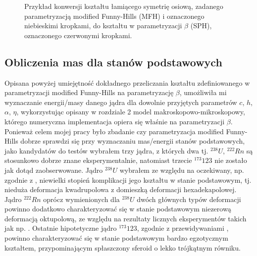 \documentclass[a4paper,polish]{article}
\numberwithin{equation}{section}
\begin{document}
\begin{figure}[ht!]
    \vspace{0.5cm}    
	\caption{Przykład konwersji kształtu łamiącego symetrię osiową, zadanego parametryzacją modified Funny-Hills (MFH) i oznaczonego niebieskimi kropkami, do kształtu w parametryzacji $\beta$ (SPH), oznaczonego czerwonymi kropkami.}
    \label{fig:example3}%
\end{figure}
\vspace*{\fill}


\clearpage
\subsection{Obliczenia mas dla stanów podstawowych}

Opisana powyżej umiejętność dokładnego przeliczania kształtu zdefiniowanego w parametryzacji modified Funny-Hills na parametryzację $\beta$, umożliwiła mi wyznaczanie energii/masy danego jądra dla dowolnie przyjętych parametrów $c$, $h$, $\alpha$, $\eta$, wykorzystując opisany w rozdziale 2 model makroskopowo-mikroskopowy, którego numeryczna implementacja opiera się właśnie na parametryzacji $\beta$. Ponieważ celem mojej pracy było zbadanie czy parametryzacja modified Funny-Hills dobrze sprawdzi się przy wyznaczaniu mas/energii stanów podstawowych, jako kandydatów do testów wybrałem trzy jądra, z których dwa tj. $^{238}U$, $^{222}Rn$ są stosunkowo dobrze znane eksperymentalnie, natomiast trzecie $^{173}123$ nie zostało jak dotąd zaobserwowane. Jądro $^{238}U$ wybrałem ze względu na oczekiwany, np. zgodnie z \cite{RIPL3}, niewielki stopień komplikacji jego kształtu w stanie podstawowym, tj. nieduża deformacja kwadrupolowa z domieszką deformacji hexadekapolowej. Jądro $^{222}Rn$ oprócz wymienionych dla $^{238}U$ dwóch głównych typów deformacji powinno dodatkowo charakteryzować się w stanie podstawowym niezerową deformacją oktupolową, ze względu na rezultaty licznych eksperymentów takich jak np. \cite{E3}. Ostatnie hipotetyczne jądro $^{173}123$, zgodnie z przewidywaniami \cite{A32}, powinno charakteryzować się w stanie podstawowym bardzo egzotycznym kształtem, przypominającym spłaszczony sferoid o lekko trójkątnym równiku. 
\end{document}
